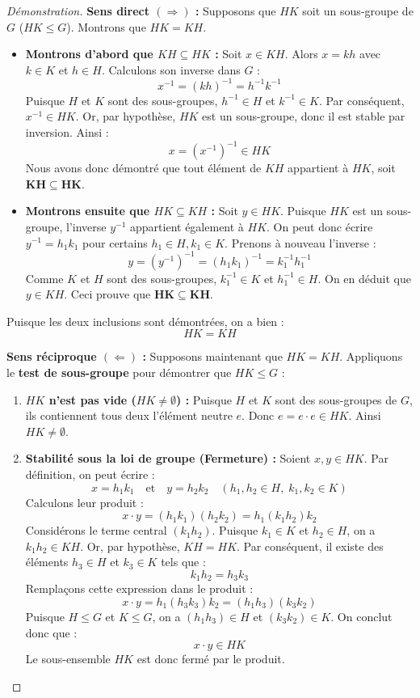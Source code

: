 \documentclass[12pt,a4paper]{report}
\begin{document}
\begin{proof}[Démonstration]
\textbf{Sens direct $(\Longrightarrow)$ :} Supposons que $HK$ soit un sous-groupe de $G$ ($HK \leq G$). Montrons que $HK = KH$.

\begin{itemize}
    \item \textbf{Montrons d'abord que $KH \subseteq HK$ :}  
    Soit $x \in KH$. Alors $x = kh$ avec $k \in K$ et $h \in H$.  
    Calculons son inverse dans $G$ :
    \[ x^{-1} = (kh)^{-1} = h^{-1}k^{-1} \]
    Puisque $H$ et $K$ sont des sous-groupes, $h^{-1} \in H$ et $k^{-1} \in K$.  
    Par conséquent, $x^{-1} \in HK$.  
    Or, par hypothèse, $HK$ est un sous-groupe, donc il est stable par inversion. Ainsi :
    \[ x = (x^{-1})^{-1} \in HK \]
    Nous avons donc démontré que tout élément de $KH$ appartient à $HK$, soit $\mathbf{KH \subseteq HK}$.

    \item \textbf{Montrons ensuite que $HK \subseteq KH$ :}  
    Soit $y \in HK$. Puisque $HK$ est un sous-groupe, l'inverse $y^{-1}$ appartient également à $HK$.  
    On peut donc écrire $y^{-1} = h_1 k_1$ pour certains $h_1 \in H, k_1 \in K$.  
    Prenons à nouveau l'inverse :
    \[ y = (y^{-1})^{-1} = (h_1 k_1)^{-1} = k_1^{-1} h_1^{-1} \]
    Comme $K$ et $H$ sont des sous-groupes, $k_1^{-1} \in K$ et $h_1^{-1} \in H$.  
    On en déduit que $y \in KH$.  
    Ceci prouve que $\mathbf{HK \subseteq KH}$.
\end{itemize}
Puisque les deux inclusions sont démontrées, on a bien :
\[ HK = KH \]

\vspace{0.3cm}
\textbf{Sens réciproque $(\Longleftarrow)$ :} Supposons maintenant que $HK = KH$.  
Appliquons le \textbf{test de sous-groupe} pour démontrer que $HK \leq G$ :

\begin{enumerate}
    \item \textbf{$HK$ n'est pas vide ($HK \neq \emptyset$) :}  
    Puisque $H$ et $K$ sont des sous-groupes de $G$, ils contiennent tous deux l'élément neutre $e$.  
    Donc $e = e \cdot e \in HK$. Ainsi $HK \neq \emptyset$.

    \item \textbf{Stabilité sous la loi de groupe (Fermeture) :}  
    Soient $x, y \in HK$. Par définition, on peut écrire :
    \[ x = h_1 k_1 \quad \text{et} \quad y = h_2 k_2 \quad (h_1, h_2 \in H, \; k_1, k_2 \in K) \]
    Calculons leur produit :
    \[ x \cdot y = (h_1 k_1)(h_2 k_2) = h_1 (k_1 h_2) k_2 \]
    Considérons le terme central $(k_1 h_2)$. Puisque $k_1 \in K$ et $h_2 \in H$, on a $k_1 h_2 \in KH$.  
    Or, par hypothèse, $KH = HK$. Par conséquent, il existe des éléments $h_3 \in H$ et $k_3 \in K$ tels que :
    \[ k_1 h_2 = h_3 k_3 \]
    Remplaçons cette expression dans le produit :
    \[ x \cdot y = h_1 (h_3 k_3) k_2 = (h_1 h_3)(k_3 k_2) \]
    Puisque $H \leq G$ et $K \leq G$, on a $(h_1 h_3) \in H$ et $(k_3 k_2) \in K$.  
    On conclut donc que :
    \[ x \cdot y \in HK \]
    Le sous-ensemble $HK$ est donc fermé par le produit.


\end{enumerate}
\end{proof}
\end{document}
